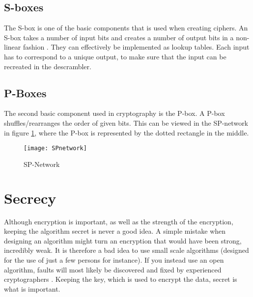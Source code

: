 \subsection{S-boxes}
The S-box is one of the basic components that is used when creating ciphers. 
An S-box takes a number of input bits and creates a number of output bits in 
a non-linear fashion \citep[pp. 74--75]{Stinson:2006}. They can effectively be 
implemented as lookup tables. Each input has to correspond to a unique output, 
to make sure that the input can be recreated in the descrambler.



\subsection{P-Boxes}
The second basic component used in cryptography is the P-box. A P-box 
shuffles/rearranges the order of given bits. This can be viewed in the 
SP-network in figure \ref{img:SPNetwork}, where the P-box is represented by the 
dotted rectangle in the middle.

\begin{figure}
  \begin{center}
    \texttt{[image: SPnetwork]}
    \caption{SP-Network}
    \label{img:SPNetwork}
  \end{center}
\end{figure}


\section{Secrecy}
Although encryption is important, as well as the strength of the encryption, 
keeping the algorithm secret is never a good idea. A simple mistake when 
designing an algorithm might turn an encryption that would have been strong,
incredibly weak. It is therefore a bad idea to use small scale algorithms  
(designed for the use of just a few persons for instance). If you instead 
use an open algorithm, faults will most likely be discovered and fixed by 
experienced cryptographers \citep[pp. 23]{Schneier:2003}. Keeping the key, 
which is used to encrypt the data, secret is what is important.
